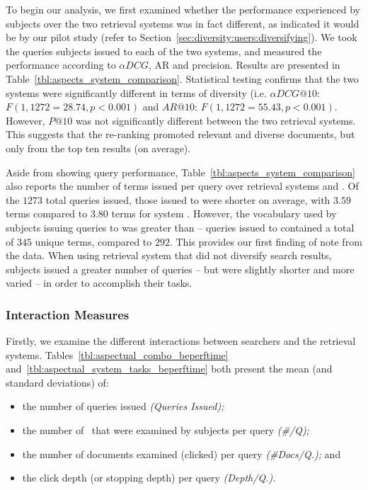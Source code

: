 To begin our analysis, we first examined whether the performance experienced by subjects over the two retrieval systems was in fact different, as indicated it would be by our pilot study (refer to Section~\ref{sec:diversity:users:diversifying}). We took the queries subjects issued to each of the two systems, and measured the performance according to $\alpha DCG$, AR and precision. Results are presented in Table~\ref{tbl:aspects_system_comparison}. Statistical testing confirms that the two systems were significantly different in terms of diversity (i.e. $\alpha DCG@10$: $F(1, 1272=28.74, p<0.001)$ and $AR@10$: $F(1,1272 = 55.43, p<0.001)$. However, $P@10$ was not significantly different between the two retrieval systems. This suggests that the re-ranking promoted relevant and diverse documents, but only from the top ten results (on average).

Aside from showing query performance, Table~\ref{tbl:aspects_system_comparison} also reports the number of terms issued per query over retrieval systems  and . Of the $1273$ total queries issued, those issued to  were shorter on average, with $3.59$ terms compared to $3.80$ terms for system . However, the vocabulary used by subjects issuing queries to  was greater than  -- queries issued to  contained a total of $345$ unique terms, compared to $292$. This provides our first finding of note from the data. When using retrieval system  that did not diversify search results, subjects issued a greater number of queries -- but were slightly shorter and more varied -- in order to accomplish their tasks.

\subsubsection{Interaction Measures}
Firstly, we examine the different interactions between searchers and the retrieval systems. Tables~\ref{tbl:aspectual_combo_beperftime} and~\ref{tbl:aspectual_system_tasks_beperftime} both present the mean (and standard deviations) of:

\begin{itemize}
    \item{the number of queries issued \emph{(Queries Issued);}}
    \item{the number of~ that were examined by subjects per query \emph{(\#/Q);}}
    \item{the number of documents examined (clicked) per query \emph{(\#Docs/Q.);} and}
    \item{the click depth (or stopping depth) per query \emph{(Depth/Q.).}}
\end{itemize}

